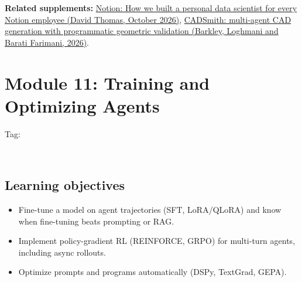 \documentclass[10pt,oneside]{report}
\newcommand{\tg}[1]{{\setlength{\fboxsep}{1.2pt}\colorbox{tag#1}{\kern1pt\textcolor{white}{\sffamily\bfseries\fontsize{5.5}{6}\selectfont\strut #1}\kern1.5pt}}}
\begin{document}
\textbf{Related supplements:} \hyperref[sup-notion]{Notion: How we built a personal data scientist for every Notion employee (David Thomas, October 2026)}, \hyperref[sup-cadsmith]{CADSmith: multi-agent CAD generation with programmatic geometric validation (Barkley, Loghmani and Barati Farimani, 2026)}.
\chapter{Module 11: Training and Optimizing Agents}\hypertarget{mod-TRAIN}{}
{\small Tag: \tg{TRAIN}}
\section{Learning objectives}
\begin{itemize}
\item Fine-tune a model on agent trajectories (SFT, LoRA/QLoRA) and know when fine-tuning beats prompting or RAG.
\item Implement policy-gradient RL (REINFORCE, GRPO) for multi-turn agents, including async rollouts.
\item Optimize prompts and programs automatically (DSPy, TextGrad, GEPA).
\end{itemize}
\end{document}
